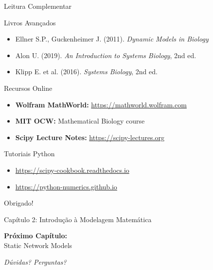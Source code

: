 \begin{frame}[allowframebreaks]{Leitura Complementar}
\begin{block}{Livros Avançados}
\begin{itemize}
    \item Ellner S.P., Guckenheimer J. (2011). \textit{Dynamic Models in Biology}
    \item Alon U. (2019). \textit{An Introduction to Systems Biology}, 2nd ed.
    \item Klipp E. et al. (2016). \textit{Systems Biology}, 2nd ed.
\end{itemize}
\end{block}

\begin{block}{Recursos Online}
\begin{itemize}
    \item \textbf{Wolfram MathWorld:} \url{https://mathworld.wolfram.com}
    \item \textbf{MIT OCW:} Mathematical Biology course
    \item \textbf{Scipy Lecture Notes:} \url{https://scipy-lectures.org}
\end{itemize}
\end{block}

\begin{block}{Tutoriais Python}
\begin{itemize}
    \item \url{https://scipy-cookbook.readthedocs.io}
    \item \url{https://python-numerics.github.io}
\end{itemize}
\end{block}
\end{frame}

\begin{frame}
\begin{center}
{\Huge Obrigado!}

\vspace{1cm}

{\Large Capítulo 2: Introdução à Modelagem Matemática}

\vspace{1cm}

\textbf{Próximo Capítulo:}\\
Static Network Models

\vspace{1cm}

\textit{Dúvidas? Perguntas?}
\end{center}
\end{frame}


